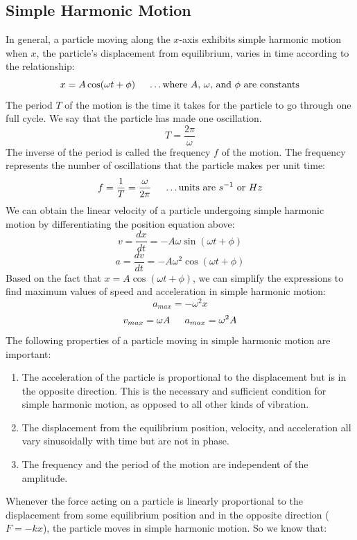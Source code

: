 \documentclass{article}
\begin{document}
	\subsection{Simple Harmonic Motion}
    	In general, a particle moving along the $x$-axis exhibits simple harmonic motion when $x$, the particle’s displacement from equilibrium, varies in time according to the relationship:
        \[
        	x=A\cos(\omega t+\phi) \indent
            \text{\ldots where $A$, $\omega$, and $\phi$ are constants}
        \]
        The period $T$ of the motion is the time it takes for the particle to go through one full cycle. We say that the particle has made one oscillation.
        \[
        T=\frac{2\pi}{\omega}
        \]
        The inverse of the period is called the frequency $f$ of the motion. The frequency represents the number of oscillations that the particle makes per unit time:
        \[
        	f=\frac{1}{T}=\frac{\omega}{2\pi} \indent
            \text{\ldots units are $s^{-1}$ or $Hz$}
        \]
        We can obtain the linear velocity of a particle undergoing simple harmonic motion by differentiating the position equation above:
        \[
        	v=\frac{dx}{dt}=-A\omega\sin(\omega t+\phi)
        \]
        \[
        	a=\frac{dv}{dt}=-A\omega^2\cos(\omega t+\phi)
        \]
        Based on the fact that $x=A\cos(\omega t+\phi)$, we can simplify the expressions to find maximum values of speed and acceleration in simple harmonic motion:
        \[
        	a_{max}=-\omega^2x
        \]
        \[
        	v_{max}=\omega A \indent
            a_{max}=\omega^2A
        \]
        The following properties of a particle moving in simple harmonic motion are important:\\
        \begin{enumerate}
        	\item The acceleration of the particle is proportional to the displacement but is in the opposite direction. This is the necessary and sufficient condition for simple harmonic motion, as opposed to all other kinds of vibration.
            \item The displacement from the equilibrium position, velocity, and acceleration all vary sinusoidally with time but are not in phase.
            \item The frequency and the period of the motion are independent of the amplitude.\\
        \end{enumerate}
        Whenever the force acting on a particle is linearly proportional to the displacement from some equilibrium position and in the opposite direction ($F=-kx$), the particle moves in simple harmonic motion. So we know that:
\end{document}
